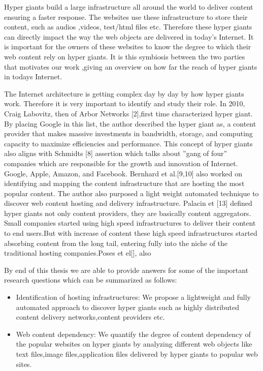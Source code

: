 Hyper giants build a large infrastructure all around the world to deliver content ensuring a faster response. The websites use these infrastructure to store their content, such as audios ,videos, test/html files etc. Therefore these hyper giants can directly impact the way the web objects are delivered in today's Internet. It is important for the owners of these websites to know the degree to which their web content rely on hyper giants. It is this symbiosis between the two parties that motivates our work ,giving an overview on how far the reach of hyper giants in todays Internet.

The Internet architecture is getting complex day by day by how hyper giants work. Therefore it is very important to identify and study their role. In 2010, Craig Labovitz, then of Arbor Networks [2],first time characterized hyper giant. By placing Google in this list, the author described the hyper giant as, a content provider that makes massive investments in bandwidth, storage, and computing capacity to maximize efficiencies and performance. This concept of hyper giants also aligns with Schmidts [8] assertion which talks about ”gang of four” companies which are responsible for the growth and innovation of Internet. Google, Apple, Amazon, and Facebook. Bernhard et al.[9,10] also worked on identifying and mapping the content infrastructure that are hosting the most popular content. The author also purposed a light weight automated technique to discover web content hosting and delivery infrastructure. Palacin et [13] defined hyper giants not
only content providers, they are basically content aggregators. Small companies started using high speed infrastructures to deliver their content to end users.But with increase of content  these high speed infrastructures started absorbing content from the long tail, entering fully into the niche of the traditional hosting companies.Poses et el[], also 

By end of this thesis we are able to provide answers for some of the important research questions which can be summarized as follows:

\begin{itemize}
\item Identification of hosting infrastructures: We propose a lightweight and
fully automated approach to discover hyper giants such as highly distributed
content delivery networks,content providers etc.

\item Web content dependency: We quantify the degree of content dependency
of the popular websites on hyper giants by analyzing different web objects like text files,image files,application files delivered by hyper giants to popular web sites.
\end{itemize}

